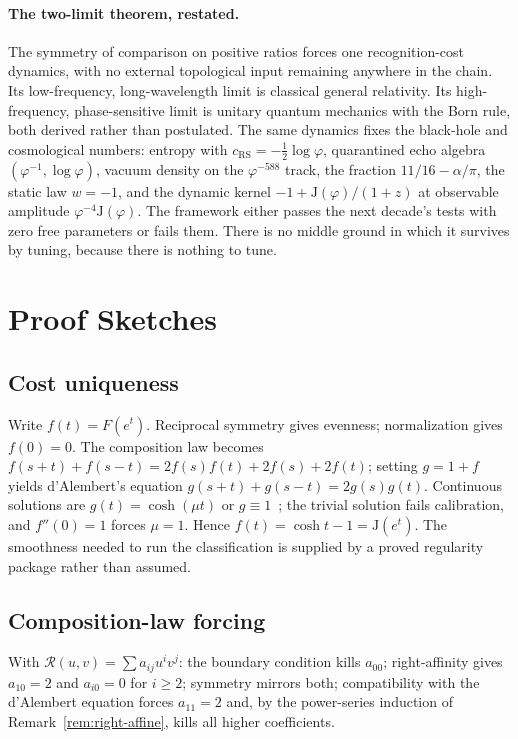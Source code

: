 \documentclass[11pt,letterpaper]{article}
\theoremstyle{definition}
\newcommand{\J}{\mathrm{J}}
\newcommand{\phiG}{\varphi}
\newcommand{\RS}{\mathrm{RS}}
\newcommand{\half}{\tfrac{1}{2}}
\begin{document}
\paragraph{The two-limit theorem, restated.}
The symmetry of comparison on positive ratios forces one
recognition-cost dynamics, with no external topological input
remaining anywhere in the chain.  Its low-frequency,
long-wavelength limit is classical general relativity.  Its
high-frequency, phase-sensitive limit is unitary quantum mechanics
with the Born rule, both derived rather than postulated.  The same
dynamics fixes the black-hole and cosmological numbers: entropy with
$c_\RS=-\half\log\phiG$, quarantined echo algebra
$(\phiG^{-1},\log\phiG)$, vacuum density on the $\phiG^{-588}$ track,
the fraction $11/16-\alpha/\pi$, the static law $w=-1$, and the
dynamic kernel $-1+\J(\phiG)/(1+z)$ at observable amplitude
$\phiG^{-4}\J(\phiG)$.  The framework either passes the next decade's
tests with zero free parameters or fails them.  There is no middle
ground in which it survives by tuning, because there is nothing to
tune.

\appendix

\section{Proof Sketches}
\label{app:proofs}

\subsection{Cost uniqueness}
Write $f(t)=F(e^t)$.  Reciprocal symmetry gives evenness; normalization
gives $f(0)=0$.  The composition law becomes
$f(s+t)+f(s-t)=2f(s)f(t)+2f(s)+2f(t)$; setting $g=1+f$ yields
d'Alembert's equation $g(s+t)+g(s-t)=2g(s)g(t)$.  Continuous solutions
are $g(t)=\cosh(\mu t)$ or $g\equiv1$~\cite{Aczel1966}; the trivial
solution fails calibration, and $f''(0)=1$ forces $\mu=1$.  Hence
$f(t)=\cosh t-1=\J(e^t)$.  The smoothness needed to run the
classification is supplied by a proved regularity package rather than
assumed.

\subsection{Composition-law forcing}
With $\mathcal{R}(u,v)=\sum a_{ij}u^iv^j$: the boundary condition
kills $a_{00}$; right-affinity gives $a_{10}=2$ and $a_{i0}=0$ for
$i\ge2$; symmetry mirrors both; compatibility with the d'Alembert
equation forces $a_{11}=2$ and, by the power-series induction of
Remark~\ref{rem:right-affine}, kills all higher coefficients.
\end{document}
